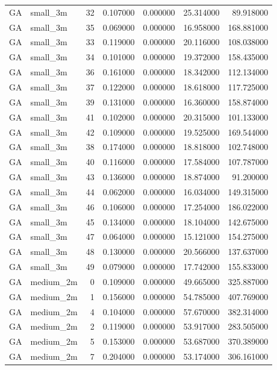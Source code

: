 \begin{tabular}{llrrrrr}
GA & small_3m & 32 & 0.107000 & 0.000000 & 25.314000 & 89.918000 \\
GA & small_3m & 35 & 0.069000 & 0.000000 & 16.958000 & 168.881000 \\
GA & small_3m & 33 & 0.119000 & 0.000000 & 20.116000 & 108.038000 \\
GA & small_3m & 34 & 0.101000 & 0.000000 & 19.372000 & 158.435000 \\
GA & small_3m & 36 & 0.161000 & 0.000000 & 18.342000 & 112.134000 \\
GA & small_3m & 37 & 0.122000 & 0.000000 & 18.618000 & 117.725000 \\
GA & small_3m & 39 & 0.131000 & 0.000000 & 16.360000 & 158.874000 \\
GA & small_3m & 41 & 0.102000 & 0.000000 & 20.315000 & 101.133000 \\
GA & small_3m & 42 & 0.109000 & 0.000000 & 19.525000 & 169.544000 \\
GA & small_3m & 38 & 0.174000 & 0.000000 & 18.818000 & 102.748000 \\
GA & small_3m & 40 & 0.116000 & 0.000000 & 17.584000 & 107.787000 \\
GA & small_3m & 43 & 0.136000 & 0.000000 & 18.874000 & 91.200000 \\
GA & small_3m & 44 & 0.062000 & 0.000000 & 16.034000 & 149.315000 \\
GA & small_3m & 46 & 0.106000 & 0.000000 & 17.254000 & 186.022000 \\
GA & small_3m & 45 & 0.134000 & 0.000000 & 18.104000 & 142.675000 \\
GA & small_3m & 47 & 0.064000 & 0.000000 & 15.121000 & 154.275000 \\
GA & small_3m & 48 & 0.130000 & 0.000000 & 20.566000 & 137.637000 \\
GA & small_3m & 49 & 0.079000 & 0.000000 & 17.742000 & 155.833000 \\
GA & medium_2m & 0 & 0.109000 & 0.000000 & 49.665000 & 325.887000 \\
GA & medium_2m & 1 & 0.156000 & 0.000000 & 54.785000 & 407.769000 \\
GA & medium_2m & 4 & 0.104000 & 0.000000 & 57.670000 & 382.314000 \\
GA & medium_2m & 2 & 0.119000 & 0.000000 & 53.917000 & 283.505000 \\
GA & medium_2m & 5 & 0.153000 & 0.000000 & 53.687000 & 370.389000 \\
GA & medium_2m & 7 & 0.204000 & 0.000000 & 53.174000 & 306.161000 \\

\end{tabular}
